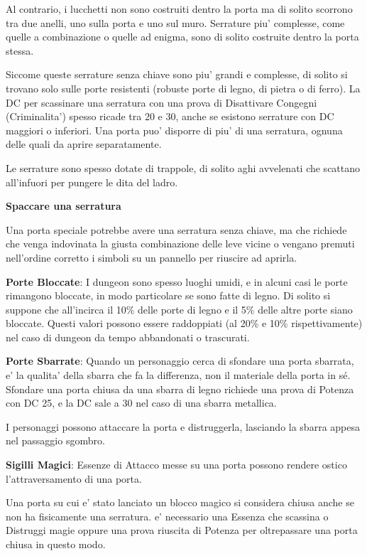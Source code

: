 \documentclass[a4paper,11pt,twoside,openany]{dndbook}
\begin{document}
{Al contrario, i lucchetti non sono costruiti dentro la porta ma di solito scorrono tra due anelli, uno sulla porta e uno sul muro. Serrature piu' complesse, come quelle a combinazione o quelle ad enigma, sono di solito costruite dentro la porta stessa. 

Siccome queste serrature senza chiave sono piu' grandi e complesse, di solito si trovano solo sulle porte resistenti (robuste porte di legno, di pietra o di ferro). 
La DC per scassinare una serratura con una prova di Disattivare Congegni (Criminalita') spesso ricade tra 20 e 30, anche se esistono serrature con DC maggiori o inferiori. Una porta puo' disporre di piu' di una serratura, ognuna delle quali da aprire separatamente.

Le serrature sono spesso dotate di trappole, di solito aghi avvelenati che scattano all'infuori per pungere le dita del ladro.

\textbf{Spaccare una serratura}

Una porta speciale potrebbe avere una serratura senza chiave, ma che richiede che venga indovinata la giusta combinazione delle leve vicine o vengano premuti nell'ordine corretto i simboli su un pannello per riuscire ad aprirla.

\textbf{Porte Bloccate}: I dungeon sono spesso luoghi umidi, e in alcuni casi le porte rimangono bloccate, in modo particolare se sono fatte di legno. Di solito si suppone che all'incirca il 10\% delle porte di legno e il 5\% delle altre porte siano bloccate. Questi valori possono essere raddoppiati (al 20\% e 10\% rispettivamente) nel caso di dungeon da tempo abbandonati o trascurati.

\textbf{Porte Sbarrate}: Quando un personaggio cerca di sfondare una porta sbarrata, e' la qualita' della sbarra che fa la differenza, non il materiale della porta in sé. Sfondare una porta chiusa da una sbarra di legno richiede una prova di Potenza con DC 25, e la DC sale a 30 nel caso di una sbarra metallica.

I personaggi possono attaccare la porta e distruggerla, lasciando la sbarra appesa nel passaggio sgombro.

\textbf{Sigilli Magici}: Essenze di Attacco messe su una porta possono rendere ostico l'attraversamento di una porta.

Una porta su cui e' stato lanciato un blocco magico si considera chiusa anche se non ha fisicamente una serratura. e' necessario una Essenza che scassina o Distruggi magie oppure una prova riuscita di Potenza per oltrepassare una porta chiusa in questo modo.

}
\end{document}

